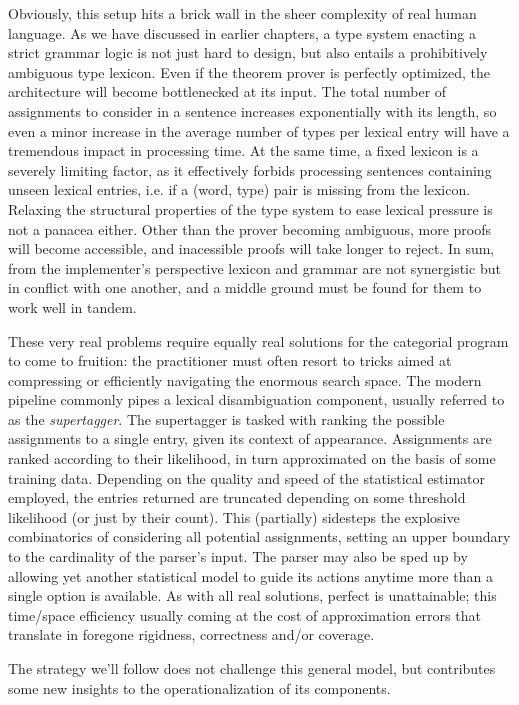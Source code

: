 Obviously, this setup hits a brick wall in the sheer complexity of real human language.
As we have discussed in earlier chapters, a type system enacting a strict grammar logic is not just hard to design, but also entails a prohibitively ambiguous type lexicon.
Even if the theorem prover is perfectly optimized, the architecture will become bottlenecked at its input.
The total number of assignments to consider in a sentence increases exponentially with its length, so even a minor increase in the average number of types per lexical entry will have a tremendous impact in processing time.
At the same time, a fixed lexicon is a severely limiting factor, as it effectively forbids processing sentences containing unseen lexical entries, i.e. if a (word, type) pair is missing from the lexicon.
Relaxing the structural properties of the type system to ease lexical pressure is not a panacea either.
Other than the prover becoming ambiguous, more proofs will become accessible, and inacessible proofs will take longer to reject.
In sum, from the implementer's perspective lexicon and grammar are not synergistic but in conflict with one another, and a middle ground must be found for them to work well in tandem.

These very real problems require equally real solutions for the categorial program to come to fruition: the practitioner must often resort to tricks aimed at compressing or efficiently navigating the enormous search space.
The modern pipeline commonly pipes a lexical disambiguation component, usually referred to as the \textit{supertagger}.
The supertagger is tasked with ranking the possible assignments to a single entry, given its context of appearance.
Assignments are ranked according to their likelihood, in turn approximated on the basis of some training data.
Depending on the quality and speed of the statistical estimator employed, the entries returned are truncated depending on some threshold likelihood (or just by their count).
This (partially) sidesteps the explosive combinatorics of considering all potential assignments, setting an upper boundary to the cardinality of the parser's input.
The parser may also be sped up by allowing yet another statistical model to guide its actions anytime more than a single option is available.
As with all real solutions, perfect is unattainable; this time/space efficiency usually coming at the cost of approximation errors that translate in foregone rigidness, correctness and/or coverage.

The strategy we'll follow does not challenge this general model, but contributes some new insights to the operationalization of its components.


